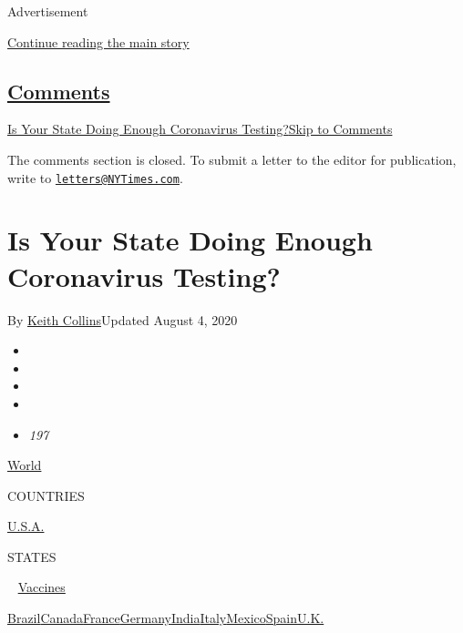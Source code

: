 Advertisement

\protect\hyperlink{after-top}{Continue reading the main story}

\hypertarget{comments}{%
\subsection{\texorpdfstring{\protect\hyperlink{commentsContainer}{Comments}}{Comments}}\label{comments}}

\href{}{Is Your State Doing Enough Coronavirus Testing?}\href{}{Skip to
Comments}

The comments section is closed. To submit a letter to the editor for
publication, write to
\href{mailto:letters@NYTimes.com}{\nolinkurl{letters@NYTimes.com}}.

\hypertarget{is-your-state-doing-enough-coronavirus-testing}{%
\section{Is Your State Doing Enough Coronavirus
Testing?}\label{is-your-state-doing-enough-coronavirus-testing}}

By \href{https://www.nytimes3xbfgragh.onion/by/keith-collins}{Keith
Collins}Updated August 4, 2020

\begin{itemize}
\item
\item
\item
\item
\item
  \emph{197}
\end{itemize}

\href{https://www.nytimes3xbfgragh.onion/interactive/2020/world/coronavirus-maps.html}{World}~

COUNTRIES

\textbar{}
\href{https://www.nytimes3xbfgragh.onion/interactive/2020/us/coronavirus-us-cases.html}{U.S.A.}~

STATES

~
\href{https://www.nytimes3xbfgragh.onion/interactive/2020/science/coronavirus-vaccine-tracker.html}{Vaccines}

\href{https://www.nytimes3xbfgragh.onion/interactive/2020/world/americas/brazil-coronavirus-cases.html}{Brazil}\href{https://www.nytimes3xbfgragh.onion/interactive/2020/world/canada/canada-coronavirus-cases.html}{Canada}\href{https://www.nytimes3xbfgragh.onion/interactive/2020/world/europe/france-coronavirus-cases.html}{France}\href{https://www.nytimes3xbfgragh.onion/interactive/2020/world/europe/germany-coronavirus-cases.html}{Germany}\href{https://www.nytimes3xbfgragh.onion/interactive/2020/world/asia/india-coronavirus-cases.html}{India}\href{https://www.nytimes3xbfgragh.onion/interactive/2020/world/europe/italy-coronavirus-cases.html}{Italy}\href{https://www.nytimes3xbfgragh.onion/interactive/2020/world/americas/mexico-coronavirus-cases.html}{Mexico}\href{https://www.nytimes3xbfgragh.onion/interactive/2020/world/europe/spain-coronavirus-cases.html}{Spain}\href{https://www.nytimes3xbfgragh.onion/interactive/2020/world/europe/united-kingdom-coronavirus-cases.html}{U.K.}

